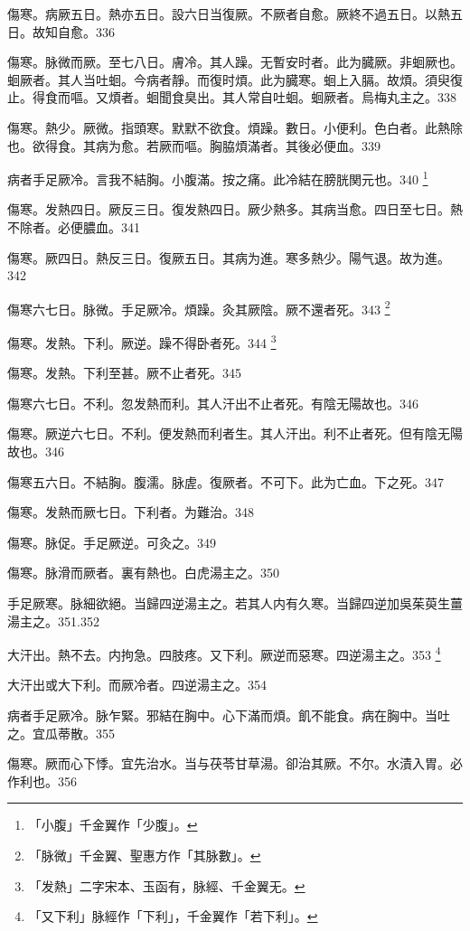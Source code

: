 傷寒。病厥五日。熱亦五日。設六日当復厥。不厥者自愈。厥終不過五日。以熱五日。故知自愈。336

傷寒。脉微而厥。至七八日。膚冷。其人躁。无暫安时者。此为臓厥。非蛔厥也。蛔厥者。其人当吐蛔。今病者靜。而復时煩。此为臓寒。蛔上入膈。故煩。須臾復止。得食而嘔。又煩者。蛔聞食臭出。其人常自吐蛔。蛔厥者。烏梅丸主之。338

傷寒。熱少。厥微。指頭寒。默默不欲食。煩躁。數日。小便利。色白者。此熱除也。欲得食。其病为愈。若厥而嘔。胸脇煩滿者。其後必便血。339

病者手足厥冷。言我不結胸。小腹滿。按之痛。此冷結在膀胱関元也。340
	\footnote{「小腹」千金翼作「少腹」。}

傷寒。发熱四日。厥反三日。復{\khaaitp 发}熱四日。厥少熱多。其病当愈。四日至七日。熱不除者。必便膿血。341

傷寒。厥四日。熱反三日。復厥五日。其病为進。寒多熱少。陽气退。故为進。342

傷寒六七日。脉微。手足厥{\khaaitp 冷}。煩躁。灸其厥陰。厥不還者死。343
	\footnote{「脉微」千金翼、聖惠方作「其脉數」。}

傷寒。{\khaaitp 发熱。}下利。厥逆。躁不得卧者死。344
	\footnote{「发熱」二字宋本、玉函有，脉經、千金翼无。}

傷寒。发熱。下利至{\khaaitp 甚。}厥不止者死。345

傷寒六七日。不利。忽发熱而利。其人汗出不止者死。有陰无陽故也。346

傷寒。厥逆六七日。不利。便发熱而利者生。其人汗出。利不止者死。但有陰无陽故也。{\maijing}346

傷寒五六日。不結胸。腹濡。脉虗。復厥者。不可下。此为亡血。{\khaaitp 下之}死。347

傷寒。发熱而厥七日。下利者。为難治。348

傷寒。脉促。手足厥逆。可灸之。349

傷寒。脉滑而厥者。裏有熱也。白虎湯主之。350

手足厥寒。脉細欲絕。当歸四逆湯主之。若其人内有久寒。当歸四逆加吳茱萸生薑湯主之。351.352

大汗出。熱不去。内拘急。四肢疼。{\khaaitp 又}下利。厥逆而惡寒。四逆湯主之。353
	\footnote{「又下利」脉經作「下利」，千金翼作「若下利」。}

大汗{\khaaitp 出}或大下利。而厥冷者。四逆湯主之。354

病者手足厥冷。脉乍緊。邪結在胸中。心下滿而煩。飢不能食。病在胸中。当吐之。宜瓜蒂散。355

傷寒。厥而心下悸。宜先治水。当与茯苓甘草湯。卻治其厥。不尔。水漬入胃。必作利也。356

